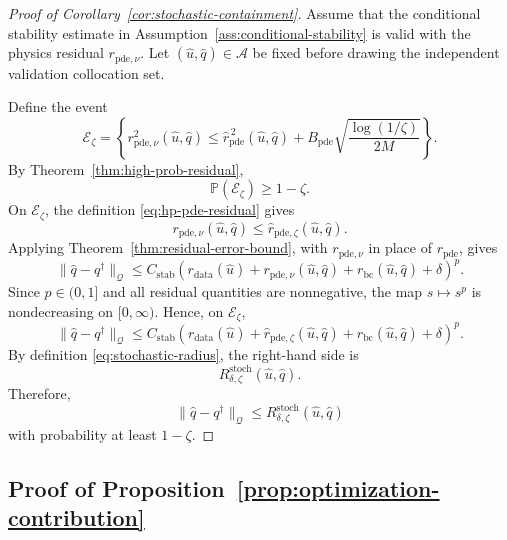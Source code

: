 \documentclass{article}
\numberwithin{equation}{section}
\theoremstyle{definition}
\begin{document}
\begin{proof}[Proof of Corollary~\ref{cor:stochastic-containment}]
Assume that the conditional stability estimate in Assumption~\ref{ass:conditional-stability} is valid with the physics residual \(r_{\mathrm{pde},\nu}\). Let \((\widehat u,\widehat q)\in\mathcal A\) be fixed before drawing the independent validation collocation set.

Define the event
\[
\mathcal E_\zeta
=
\left\{
r_{\mathrm{pde},\nu}^{2}(\widehat u,\widehat q)
\le
\widehat r_{\mathrm{pde}}^{\,2}(\widehat u,\widehat q)
+
B_{\mathrm{pde}}
\sqrt{\frac{\log(1/\zeta)}{2M}}
\right\}.
\]
By Theorem~\ref{thm:high-prob-residual},
\[
\mathbb P(\mathcal E_\zeta)\ge 1-\zeta.
\]
On \(\mathcal E_\zeta\), the definition \eqref{eq:hp-pde-residual} gives
\[
r_{\mathrm{pde},\nu}(\widehat u,\widehat q)
\le
\widehat r_{\mathrm{pde},\zeta}(\widehat u,\widehat q).
\]
Applying Theorem~\ref{thm:residual-error-bound}, with \(r_{\mathrm{pde},\nu}\) in place of \(r_{\mathrm{pde}}\), gives
\[
\|\widehat q-q^\dagger\|_{\mathcal Q}
\le
C_{\mathrm{stab}}
\left(
r_{\mathrm{data}}(\widehat u)
+
r_{\mathrm{pde},\nu}(\widehat u,\widehat q)
+
r_{\mathrm{bc}}(\widehat u,\widehat q)
+
\delta
\right)^p .
\]
Since \(p\in(0,1]\) and all residual quantities are nonnegative, the map \(s\mapsto s^p\) is nondecreasing on \([0,\infty)\). Hence, on \(\mathcal E_\zeta\),
\[
\|\widehat q-q^\dagger\|_{\mathcal Q}
\le
C_{\mathrm{stab}}
\left(
r_{\mathrm{data}}(\widehat u)
+
\widehat r_{\mathrm{pde},\zeta}(\widehat u,\widehat q)
+
r_{\mathrm{bc}}(\widehat u,\widehat q)
+
\delta
\right)^p.
\]
By definition \eqref{eq:stochastic-radius}, the right-hand side is
\[
R_{\delta,\zeta}^{\mathrm{stoch}}(\widehat u,\widehat q).
\]
Therefore,
\[
\|\widehat q-q^\dagger\|_{\mathcal Q}
\le
R_{\delta,\zeta}^{\mathrm{stoch}}(\widehat u,\widehat q)
\]
with probability at least \(1-\zeta\).
\end{proof}

\subsection{Proof of Proposition~\ref{prop:optimization-contribution}}
\end{document}
